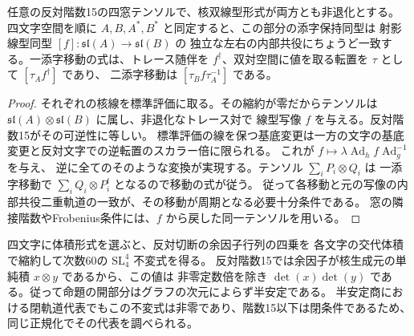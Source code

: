 \begin{proposition}\label{prop:opposite-adjoint-equivalence}
任意の反対階数15の四窓テンソルで、核双線型形式が両方とも非退化とする。
四文字空間を順に $A,B,A^*,B^*$ と同定すると、この部分の添字保持同型は
射影線型同型 $[f]\colon\mathfrak{sl}(A)\longrightarrow\mathfrak{sl}(B)$ の
独立な左右の内部共役にちょうど一致する。一添字移動の式は、トレース随伴を
$f^\dagger$、双対空間に値を取る転置を $\tau$ として $[\tau_A f^\dagger]$ であり、
二添字移動は $[\tau_B f\tau_A^{-1}]$ である。
\end{proposition}
\begin{proof}
それぞれの核線を標準評価に取る。その縮約が零だからテンソルは
$\mathfrak{sl}(A)\otimes\mathfrak{sl}(B)$ に属し、非退化なトレース対で
線型写像 $f$ を与える。反対階数15がその可逆性に等しい。
標準評価の線を保つ基底変更は一方の文字の基底変更と反対文字での逆転置のスカラー倍に限られる。
これが $f\mapsto \lambda\operatorname{Ad}_h f\operatorname{Ad}_g^{-1}$ を与え、
逆に全てのそのような変換が実現する。テンソル $\sum_i P_i\otimes Q_i$ は
一添字移動で $\sum_i Q_i\otimes P_i^t$ となるので移動の式が従う。
従って各移動と元の写像の内部共役二重軌道の一致が、その移動が周期となる必要十分条件である。
窓の隣接階数やFrobenius条件には、$f$ から戻した同一テンソルを用いる。
\end{proof}

四文字に体積形式を選ぶと、反対切断の余因子行列の四乗を
各文字の交代体積で縮約して次数60の $\mathrm{SL}_4^4$ 不変式を得る。
反対階数15では余因子が核生成元の単純積 $x\otimes y$ であるから、この値は
非零定数倍を除き $\det(x)\det(y)$ である。従って命題の開部分はグラフの次元によらず半安定である。
半安定商における閉軌道代表でもこの不変式は非零であり、階数15以下は閉条件であるため、
同じ正規化でその代表を調べられる。
